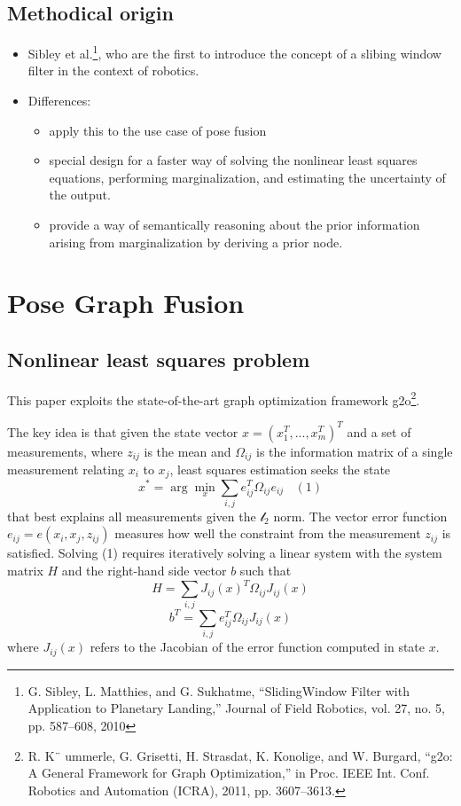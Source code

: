 \documentclass[letterpaper,11pt]{article}
\begin{document}
\subsection{Methodical origin}

\begin{itemize}
	\item Sibley et al.\footnote{G. Sibley, L. Matthies, and G. Sukhatme, “SlidingWindow Filter with Application to Planetary Landing,” Journal of Field Robotics, vol. 27, no. 5, pp. 587–608, 2010}, who are the first to introduce the concept of a slibing window filter in the context of robotics.
	\item Differences:
	\begin{itemize}
		\item apply this to the use case of pose fusion
		\item special design for a faster way of solving the nonlinear least squares equations, performing marginalization, and estimating the uncertainty of the output.
		\item provide a way of semantically reasoning about the prior information arising from marginalization by deriving a prior node.
	\end{itemize}
\end{itemize}

\section{Pose Graph Fusion}

\subsection{Nonlinear least squares problem}

This paper exploits the state-of-the-art graph optimization framework g2o\footnote{R. K¨ ummerle, G. Grisetti, H. Strasdat, K. Konolige, and W. Burgard, “g2o: A General Framework for Graph Optimization,” in Proc. IEEE Int. Conf. Robotics and Automation (ICRA), 2011, pp. 3607–3613.}.

The key idea is that given the state vector \(x=(x_1^T, ..., x_m^T)^T\) and a set of measurements, where \(z_{ij}\) is the mean and \(\Omega_{ij}\) is the information matrix of a single measurement relating \(x_i\) to \(x_j\), least squares estimation seeks the state
\[x^*=\arg\min_x{\sum_{i,j}e_{ij}^T\Omega_{ij}e_{ij}}~~~~(1)\]
that best explains all measurements given the \(\mathcal{l}_2\) norm. The vector error function \(e_{ij}=e(x_i,x_j,z_{ij})\) measures how well the constraint from the measurement \(z_{ij}\) is satisfied. Solving (1) requires iteratively solving a linear system with the system matrix \(H\) and the right-hand side vector \(b\) such that
\[H=\sum_{i,j}{J_{ij}(x)^T\Omega_{ij}J_{ij}(x)}\]
\[b^T=\sum_{i,j}e_{ij}^T\Omega_{ij}J_{ij}(x)\]
where \(J_{ij}(x)\) refers to the Jacobian of the error function computed in state \(x\).
\end{document}
